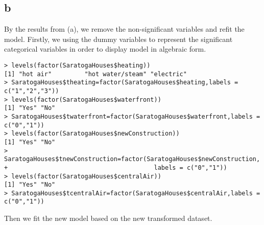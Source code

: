 \documentclass[12pt]{article}
\begin{document}
\subsection{b}
By the results from (a), we remove the non-significant variables and refit the model. Firstly, we using the dummy variables to represent the significant categorical variables in order to display model in algebraic form.  
\begin{verbatim}
> levels(factor(SaratogaHouses$heating))
[1] "hot air"         "hot water/steam" "electric"       
> SaratogaHouses$theating=factor(SaratogaHouses$heating,labels = c("1","2","3"))
> levels(factor(SaratogaHouses$waterfront))
[1] "Yes" "No" 
> SaratogaHouses$twaterfront=factor(SaratogaHouses$waterfront,labels = c("0","1"))
> levels(factor(SaratogaHouses$newConstruction))
[1] "Yes" "No" 
> SaratogaHouses$tnewConstruction=factor(SaratogaHouses$newConstruction,
+                                        labels = c("0","1"))
> levels(factor(SaratogaHouses$centralAir))
[1] "Yes" "No" 
> SaratogaHouses$tcentralAir=factor(SaratogaHouses$centralAir,labels = c("0","1"))
\end{verbatim}
Then we fit the new model based on the new transformed dataset.
\end{document}
